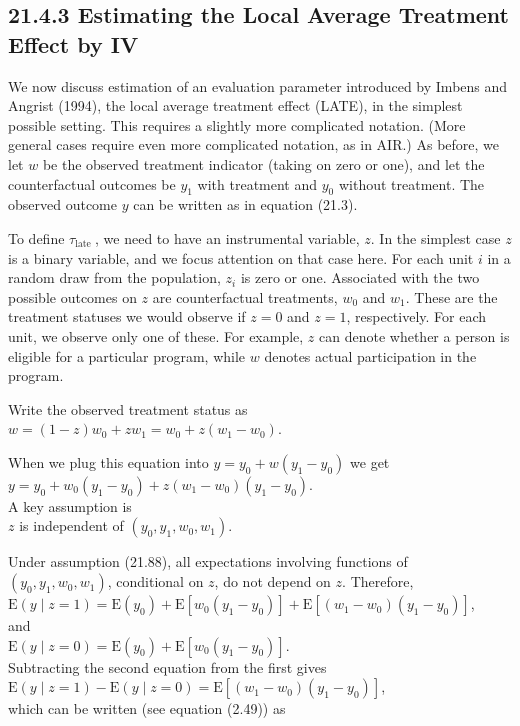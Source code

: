 \documentclass[10pt]{article}
\begin{document}
\subsection*{21.4.3 Estimating the Local Average Treatment Effect by IV}
We now discuss estimation of an evaluation parameter introduced by Imbens and Angrist (1994), the local average treatment effect (LATE), in the simplest possible setting. This requires a slightly more complicated notation. (More general cases require even more complicated notation, as in AIR.) As before, we let $w$ be the observed treatment indicator (taking on zero or one), and let the counterfactual outcomes be $y_{1}$ with treatment and $y_{0}$ without treatment. The observed outcome $y$ can be written as in equation (21.3).

To define $\tau_{\text {late }}$, we need to have an instrumental variable, $z$. In the simplest case $z$ is a binary variable, and we focus attention on that case here. For each unit $i$ in a random draw from the population, $z_{i}$ is zero or one. Associated with the two possible outcomes on $z$ are counterfactual treatments, $w_{0}$ and $w_{1}$. These are the treatment statuses we would observe if $z=0$ and $z=1$, respectively. For each unit, we observe only one of these. For example, $z$ can denote whether a person is eligible for a particular program, while $w$ denotes actual participation in the program.

Write the observed treatment status as\\
$w=(1-z) w_{0}+z w_{1}=w_{0}+z\left(w_{1}-w_{0}\right)$.

When we plug this equation into $y=y_{0}+w\left(y_{1}-y_{0}\right)$ we get\\
$y=y_{0}+w_{0}\left(y_{1}-y_{0}\right)+z\left(w_{1}-w_{0}\right)\left(y_{1}-y_{0}\right)$.\\
A key assumption is\\
$z$ is independent of $\left(y_{0}, y_{1}, w_{0}, w_{1}\right)$.

Under assumption (21.88), all expectations involving functions of $\left(y_{0}, y_{1}, w_{0}, w_{1}\right)$, conditional on $z$, do not depend on $z$. Therefore,\\
$\mathrm{E}(y \mid z=1)=\mathrm{E}\left(y_{0}\right)+\mathrm{E}\left[w_{0}\left(y_{1}-y_{0}\right)\right]+\mathrm{E}\left[\left(w_{1}-w_{0}\right)\left(y_{1}-y_{0}\right)\right]$,\\
and\\
$\mathrm{E}(y \mid z=0)=\mathrm{E}\left(y_{0}\right)+\mathrm{E}\left[w_{0}\left(y_{1}-y_{0}\right)\right]$.\\
Subtracting the second equation from the first gives\\
$\mathrm{E}(y \mid z=1)-\mathrm{E}(y \mid z=0)=\mathrm{E}\left[\left(w_{1}-w_{0}\right)\left(y_{1}-y_{0}\right)\right]$,\\
which can be written (see equation (2.49)) as
\end{document}
